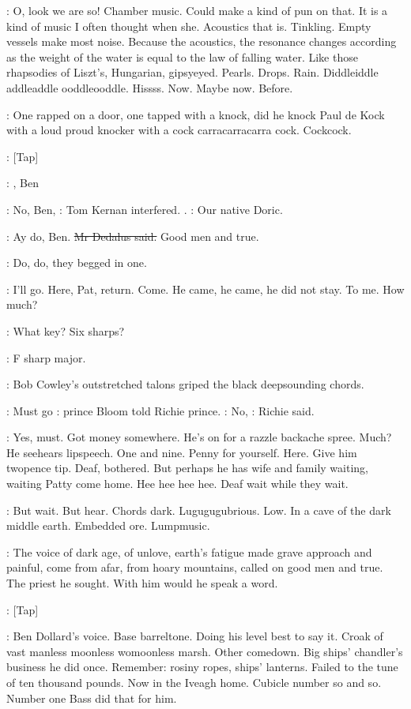 \BloomInt:
O,
look we are so!
Chamber music.
Could make a kind of pun on
that.
It is a kind of music I often thought when she.
Acoustics that is.
Tinkling.
Empty vessels make most noise.
Because the acoustics,
the
resonance changes according as the weight of the water is equal to the law
of falling water.
Like those rhapsodies of Liszt's,
Hungarian,
gipsyeyed.
Pearls.
Drops.
Rain.
Diddleiddle addleaddle ooddleooddle.
Hissss.
Now.
Maybe now.
Before.

\BloomInt:
One rapped on a door,
one tapped with a knock,
did he knock Paul
de Kock with a loud proud knocker with a cock carracarracarra cock.
Cockcock.

\stripling:
[Tap]

\cowley:
,
Ben

:
No,
Ben,
:
Tom Kernan interfered.
.
:
Our native Doric.

\simon:
Ay do,
Ben.
\sout{Mr Dedalus said.}
Good men and true.

:
Do,
do,
they begged in one.

\BloomInt:
I'll go.
Here,
Pat,
return.
Come.
He came,
he came,
he did not stay.
To me.
How much?

\cowley:
What key?
Six sharps?

\dollard:
F sharp major.

:
Bob Cowley's outstretched talons griped the
black deepsounding chords.

\BloomInt:
Must go
:
prince Bloom told Richie prince.
\goulding:
No,
:
Richie said.

\BloomInt:
Yes,
must.
Got money somewhere.
He's on for a razzle backache spree.
Much?
He
seehears lipspeech.
One and nine.
Penny for yourself.
Here.
Give him
twopence tip.
Deaf,
bothered.
But perhaps he has wife and family waiting,
waiting Patty come home.
Hee hee hee hee.
Deaf wait while they wait.

\BloomInt:
But wait.
But hear.
Chords dark.
Lugugugubrious.
Low.
In a cave of
the dark middle earth.
Embedded ore.
Lumpmusic.

:
The voice of dark age,
of unlove,
earth's fatigue made grave approach
and painful,
come from afar,
from hoary mountains,
called on good men
and true.
The priest he sought.
With him would he speak a word.

\stripling:
[Tap]

\BloomInt:
Ben Dollard's voice.
Base barreltone.
Doing his level best to say it.
Croak of vast manless moonless womoonless marsh.
Other comedown.
Big
ships' chandler's business he did once.
Remember:
rosiny ropes,
ships'
lanterns.
Failed to the tune of ten thousand pounds.
Now in the Iveagh
home.
Cubicle number so and so.
Number one Bass did that for him.

